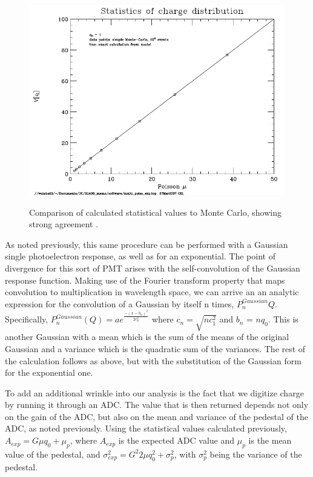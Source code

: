 \begin{figure}
\caption{Comparison of calculated statistical values to Monte Carlo, showing strong agreement \cite{PMTCalibration}.}
\includegraphics[width=\textwidth]{DC_Results/Photostats.jpg}
\label{photostats_MC}
\end{figure}

As noted previously, this same procedure can be performed with a Gaussian single photoelectron response, as well as for an exponential. The point of divergence for this sort of PMT arises with the self-convolution of the Gaussian response function. Making use of the Fourier transform property that maps convolution to multiplication in wavelength space, we can arrive an an analytic expression for the convolution of a Gaussian by itself n times, $P^{Gaussian}_n{Q}$. Specifically, $P^{Gaussian}_n(Q) = a e^{\frac{-(x-b_n)^2}{2c_n^2}}$ where $c_n = \sqrt{nc_1^2}$ and $b_n$ = $nq_0$. This is another Gaussian with a mean which is the sum of the means of the original Gaussian and a variance which is the quadratic sum of the variances.  The rest of the calculation follows as above, but with the substitution of the Gaussian form for the exponential one. 

To add an additional wrinkle into our analysis is the fact that we digitize charge by running it through an ADC. The value that is then returned depends not only on the gain of the ADC, but also on the mean and variance of the pedestal of the ADC, as noted previously. Using the statistical values calculated previously, $A_{exp} = G \mu q_0 + \mu_p$, where $A_{exp}$ is the expected ADC  value and $\mu_p$ is the mean value of the pedestal, and $\sigma^2_{exp}= G^2 2\mu q_0^2 + \sigma_p^2$, with  $\sigma^2_p$ being the variance of the pedestal.  

